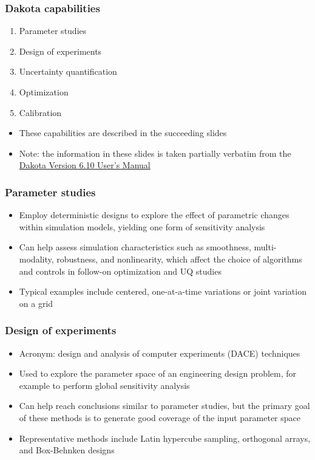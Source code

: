 \documentclass[t]{beamer}
\begin{document}

\begin{frame}
  \frametitle{Dakota capabilities}
  \begin{enumerate}[1]
    \item Parameter studies
    \item Design of experiments
    \item Uncertainty quantification
    \item Optimization
    \item Calibration
  \end{enumerate}
  \vskip 0.5in
  \begin{itemize}
    \item These capabilities are described in the succeeding slides
    \item Note: the information in these slides is taken partially verbatim from
          the \href{https://dakota.sandia.gov/content/manuals}{Dakota Version
          6.10 User's Manual}
  \end{itemize}
\end{frame}


\begin{frame}
  \frametitle{Parameter studies}
  \begin{itemize}
    \item Employ deterministic designs to explore the effect of parametric
          changes within simulation models, yielding one form of sensitivity
          analysis
    \item Can help assess simulation characteristics such as smoothness,
          multi-modality, robustness, and nonlinearity, which affect the choice
          of algorithms and controls in follow-on optimization and UQ studies
    \item Typical examples include centered, one-at-a-time variations or joint
          variation on a grid
  \end{itemize}
\end{frame}


\begin{frame}
  \frametitle{Design of experiments}
  \begin{itemize}
    \item Acronym: design and analysis of computer experiments (DACE) techniques
    \item Used to explore the parameter space of an engineering design problem,
          for example to perform global sensitivity analysis
    \item Can help reach conclusions similar to parameter studies, but the
          primary goal of these methods is to generate good coverage of the
          input parameter space
    \item Representative methods include Latin hypercube sampling, orthogonal
          arrays, and Box-Behnken designs
  \end{itemize}
\end{frame}
\end{document}
